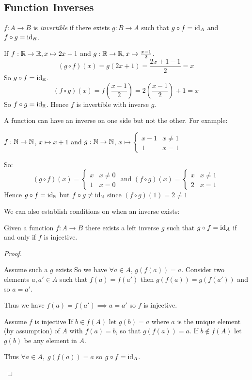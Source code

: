 \documentclass[../main.tex]{subfiles}
\begin{document}
\subsection{Function Inverses}
\begin{definition}[Invertible]
  $f: A \to B$ is \textit{invertible} if there exists $g: B \to A$ such that $g \circ f =\mathrm{id}_A$ and $f \circ g = \mathrm{id}_B$.
\end{definition}
\begin{example}
  If $f: \mathbb{R} \to \mathbb{R}, x\mapsto 2x + 1$ and $g: \mathbb{R} \to \mathbb{R}, x\mapsto \frac{x-1}{2}$.
  \[
    (g \circ f)(x) = g(2x + 1) = \frac{2x + 1 - 1}{2} = x
  \]
  So $g \circ f = \mathrm{id}_{\mathbb{R}}$.
  \[
    (f \circ g)(x) = f\left(\frac{x-1}{2}\right) = 2\left(\frac{x-1}{2}\right) + 1 = x
  \]
  So $f \circ g = \mathrm{id}_{\mathbb{R}}$.
  Hence $f$ is invertible with inverse $g$.
\end{example}
\begin{remark}[Warning]
  A function can have an inverse on one side but not the other. For example:

  $f: \mathbb{N} \to \mathbb{N}$, $x \mapsto x + 1$ and $g: \mathbb{N} \to \mathbb{N}$, $x \mapsto
  \begin{cases}
  x-1 & x \neq 1 \\
  1 & x =1
  \end{cases}$

  So:
  \[
    (g \circ f)(x) = \begin{cases}
      x & x \neq 0 \\
      1 & x = 0
    \end{cases}
    \text{ and }
    (f \circ g)(x) = \begin{cases}
      x & x \neq 1 \\
      2 & x = 1
    \end{cases}
  \]
  Hence $g \circ f = \mathrm{id}_{\mathbb{N}}$ but $f \circ g \neq \mathrm{id}_{\mathbb{N}}$ since $(f \circ g)(1) = 2 \neq 1$
\end{remark}
We can also establish conditions on when an inverse exists:
\begin{proposition}
  Given a function $f: A \to B$ there exists a left inverse $g$ such that $g \circ f = \mathrm{id}_A$ if and only if $f$ is injective.
  \label{invInjective}
\end{proposition}
\begin{proof}
  \begin{proofdirection}{Assume such a $g$ exists}
    So we have $\forall a \in A$, $g(f(a)) = a$.
    Consider two elements $a, a' \in A$ such that $f(a) = f(a')$ then $g(f(a)) = g(f(a'))$ and so $a = a'$.

    Thus we have $f(a) = f(a') \implies a = a'$ so $f$ is injective.
  \end{proofdirection}
  \begin{proofdirection}{Assume $f$ is injective}
    If $b \in f(A)$ let $g(b) = a$ where $a$ is the unique element (by assumption) of $A$ with $f(a) = b$, so that $g(f(a)) = a$.
    If $b \notin f(A)$ let $g(b)$ be any element in $A$.

    Thus $\forall a \in A,\; g(f(a)) = a$ so $g \circ f = \mathrm{id}_A$.
  \end{proofdirection}
\end{proof}
\end{document}
